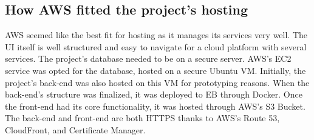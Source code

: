\subsection{How AWS fitted the project's hosting}
AWS seemed like the best fit for hosting as it manages its services very well. The UI itself is well structured and easy to navigate for a cloud platform with several services. The project's database needed to be on a secure server. AWS's EC2 service was opted for the database, hosted on a secure Ubuntu VM. Initially, the project's back-end was also hosted on this VM for prototyping reasons. When the back-end's structure was finalized, it was deployed to EB through Docker. Once the front-end had its core functionality, it was hosted through AWS's S3 Bucket. The back-end and front-end are both HTTPS thanks to AWS's Route 53, CloudFront, and Certificate Manager.

